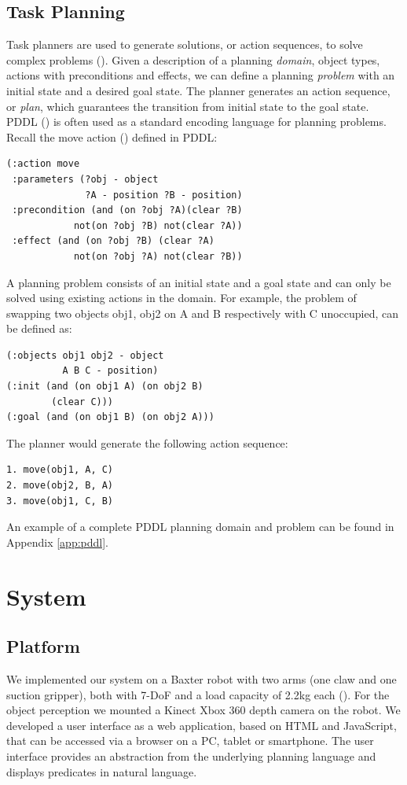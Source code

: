 \subsection{Task Planning}
\label{sec:planning}
Task planners are used to generate solutions, or action sequences, to solve complex problems ().
Given a description of a planning \textit{domain}, \ie object types, actions with preconditions and effects, we can define a planning \textit{problem} with an initial state and a desired goal state. 
The planner generates an action sequence, or \textit{plan}, which guarantees the transition from initial state to the goal state. 
PDDL () %
is often used as a standard encoding language for planning problems.
Recall the move action () defined in PDDL:

\begin{verbatim}
(:action move
 :parameters (?obj - object 
              ?A - position ?B - position)
 :precondition (and (on ?obj ?A)(clear ?B)
            not(on ?obj ?B) not(clear ?A))
 :effect (and (on ?obj ?B) (clear ?A)
            not(on ?obj ?A) not(clear ?B))
\end{verbatim}

A planning problem consists of an initial state and a goal state and can only be solved using existing actions in the domain.
For example, the problem of swapping two objects obj1, obj2 on A and B respectively with C unoccupied, can be defined as:
\begin{verbatim}
(:objects obj1 obj2 - object
          A B C - position)
(:init (and (on obj1 A) (on obj2 B) 
        (clear C)))
(:goal (and (on obj1 B) (on obj2 A)))
\end{verbatim}
The planner would generate the following action sequence:
\begin{verbatim}
1. move(obj1, A, C)
2. move(obj2, B, A)
3. move(obj1, C, B)
\end{verbatim}
An example of a complete PDDL planning domain and problem can be found in Appendix \ref{app:pddl}.


\section{System}
\label{sec:system}
\subsection{Platform}
\label{sec:platform}
We implemented our system on a Baxter robot with two arms (one claw and one suction gripper), both with 7-DoF and a load capacity of 2.2kg each ().
For the object perception we mounted a Kinect Xbox 360 depth camera on the robot.
We developed a user interface as a web application, based on HTML and JavaScript, that can be accessed via a browser on a PC, tablet or smartphone.
The user interface provides an abstraction from the underlying planning language and displays predicates in natural language.

